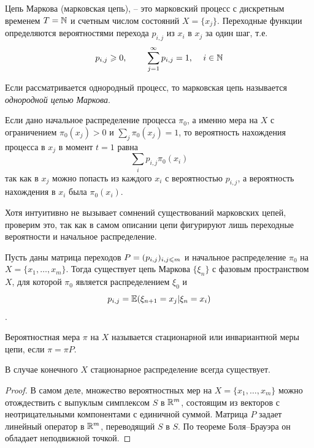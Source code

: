 \begin{definition}
    Цепь Маркова (марковская цепь), -- это марковский процесс с дискретным временем $T = \N$ и счетным числом состояний $X = \{x_j\}$. Переходные функции определяются вероятностями перехода $p_{i,j}$ из $x_i$ в $x_j$ за один шаг, т.е.
    \begin{equation*}
        p_{i,j} \geq 0 \text{, \qquad} \sum\limits_{j=1}^{\infty}p_{i,j}=1 \text{, \quad} i \in \N
    \end{equation*}
\end{definition}

\begin{definition}
    Если рассматривается однородный процесс, то марковская цепь называется \textit{однородной цепью Маркова}.
\end{definition}

\begin{note}
    Если дано начальное распределение процесса $\pi_0$, а именно мера на $X$ с ограничением $\pi_0(x_j) > 0$ и $\sum_{j}\pi_0(x_j) = 1$, то вероятность нахождения процесса в $x_j$ в момент $t = 1$ равна 
    $$\sum_i p_{i,j}\pi_0(x_i)$$
    так как в $x_j$ можно попасть из каждого $x_i$ с вероятностью $p_{i,j}$, а вероятность нахождения в $x_i$ была $\pi_0(x_i)$.
\end{note}

Хотя интуитивно не вызывает сомнений существований марковских цепей, проверим это, так как в самом описании цепи фигурируют
лишь переходные вероятности и начальное распределение.
\begin{theorem}
    Пусть даны матрица переходов $\P = (p_{i,j})_{i,j\leq m}$ и начальное распределение $\pi_0$ на $X = \{x_1, \ldots , x_m\}$. Тогда существует цепь Маркова $\{\xi_n\}$ с фазовым пространством $X$, для которой $\pi_0$ является распределением $\xi_0$ и $$p_{i,j} = \E(\xi_{n+1} = x_j |\xi_n = x_i)$$.
\end{theorem}

\begin{definition}
    Вероятностная мера $\pi$ на $X$ называется стационарной или инвариантной меры цепи, если
    $\pi = \pi P$.
\end{definition}

\begin{statement}
    В случае конечного $X$ стационарное распределение всегда существует.
\end{statement}

\begin{proof}
    В самом деле, множество вероятностных мер на $X = \{x_1, \ldots, x_m\}$ можно отождествить с выпуклым симплексом $S$ в $\R^m$, состоящим из векторов с неотрицательными компонентами с единичной суммой. Матрица $P$ задает линейный оператор в $\R^m$, переводящий $S$ в $S$. По теореме Боля–Брауэра он обладает неподвижной точкой. 
\end{proof}